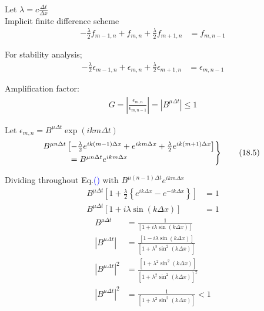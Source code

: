\documentclass[fleqn,10pt]{SelfArx} %
\newcommand{\myeqref}[1]{Eq.\textcolor{blue}{\textup{(\getrefnumber{#1})}}}
\begin{document}
Let \( \lambda = c \frac{\Delta t}{\Delta x} \) \\
Implicit finite difference scheme
\begin{align*}
	-\frac{\lambda}{2}f_{m-1,n} + f_{m,n} + \frac{\lambda}{2} f_{m+1,n} &= f_{m,n-1}
\end{align*}

For stability analysis;
\begin{align*}
	-\frac{\lambda}{2}\epsilon_{m-1,n} + \epsilon_{m,n} + \frac{\lambda}{2} \epsilon_{m+1,n} &= \epsilon_{m,n-1} \tag{18.3} \label{eq:18.3}
\end{align*}

Amplification factor:
\begin{align*}
	G = \left|\frac{\epsilon_{m,n}}{\epsilon_{m,n-1}}\right| = \left|B^{\mu\Delta t}\right| \leq 1 \tag{18.4} \label{eq:18.4}
\end{align*}

Let \( \epsilon_{m,n} = B^{\mu \Delta t} \exp(ikm\Delta t) \)  
\begin{align*}
	\begin{rcases}
		&\mspace{-25mu} B^{\mu n \Delta t} \left[-\frac{\lambda}{2}e^{ik(m-1)\Delta x} + e^{ikm\Delta x} + \frac{\lambda}{2}e^{ik(m+1)\Delta x}\right] \\ &\quad \quad= B^{\mu n \Delta t} e^{ikm\Delta x}
	\end{rcases} \tag{18.5} \label{eq:18.5}
\end{align*}

Dividing throughout \myeqref{eq:18.5} with \( B^{\mu (n-1) \Delta t} e^{ikm\Delta x} \)
\begin{align*}
	B^{\mu \Delta t} \left[1 + \frac{\lambda}{2}\left\{e^{ik\Delta x} - e^{-ik\Delta x}\right\} \right] &= 1 \\
	B^{\mu \Delta t} \left[1 + i\lambda \sin(k\Delta x) \right] &= 1
\end{align*}
\begin{align*}
	B^{\mu \Delta t} &= \frac{1}{\left[1 + i\lambda \sin(k\Delta x) \right]} \\
	\left|B^{\mu \Delta t}\right| &= \frac{\left[1 - i\lambda \sin(k\Delta x) \right]}{\left[1 + \lambda^2 \sin^2(k\Delta x) \right]} \\
	\left|B^{\mu \Delta t}\right|^2 &= \frac{\left[1 + \lambda^2 \sin^2(k\Delta x) \right]}{\left[1 + \lambda^2 \sin^2(k\Delta x) \right]^2} \\
	\left|B^{\mu \Delta t}\right|^2 &= \frac{1}{\left[1 + \lambda^2 \sin^2(k\Delta x) \right]} < 1
\end{align*}
\end{document}
